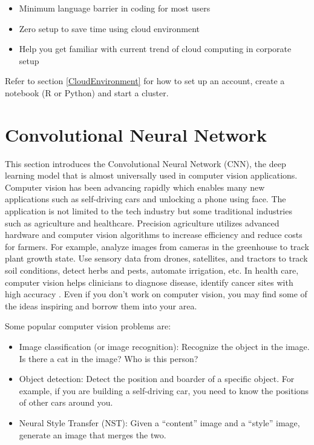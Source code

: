 \documentclass[12pt,]{krantz}
\providecommand{\tightlist}{%
  \setlength{\itemsep}{0pt}\setlength{\parskip}{0pt}}
\begin{document}
\begin{itemize}
\tightlist
\item
  Minimum language barrier in coding for most users
\item
  Zero setup to save time using cloud environment
\item
  Help you get familiar with current trend of cloud computing in corporate setup
\end{itemize}

Refer to section \ref{CloudEnvironment} for how to set up an account, create a notebook (R or Python) and start a cluster.

\hypertarget{convolutional-neural-network}{%
\section{Convolutional Neural Network}\label{convolutional-neural-network}}

This section introduces the Convolutional Neural Network (CNN), the deep learning model that is almost universally used in computer vision applications. Computer vision has been advancing rapidly which enables many new applications such as self-driving cars and unlocking a phone using face. The application is not limited to the tech industry but some traditional industries such as agriculture and healthcare. Precision agriculture utilizes advanced hardware and computer vision algorithms to increase efficiency and reduce costs for farmers. For example, analyze images from cameras in the greenhouse to track plant growth state. Use sensory data from drones, satellites, and tractors to track soil conditions, detect herbs and pests, automate irrigation, etc. In health care, computer vision helps clinicians to diagnose disease, identify cancer sites with high accuracy \citep{gloria2019}. Even if you don't work on computer vision, you may find some of the ideas inspiring and borrow them into your area.

Some popular computer vision problems are:

\begin{itemize}
\tightlist
\item
  Image classification (or image recognition): Recognize the object in the image. Is there a cat in the image? Who is this person?
\item
  Object detection: Detect the position and boarder of a specific object. For example, if you are building a self-driving car, you need to know the positions of other cars around you.
\item
  Neural Style Transfer (NST): Given a ``content'' image and a ``style'' image, generate an image that merges the two.
\end{itemize}
\end{document}
